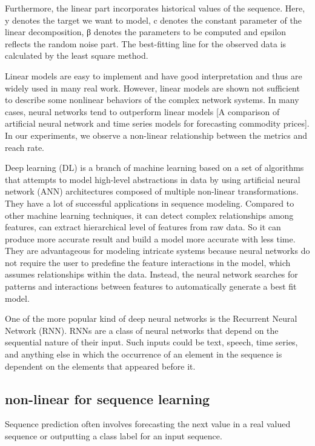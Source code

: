 \documentclass[5p]{elsarticle}
\newcommand{\dabiaolv}{reach rate}
\begin{document}
Furthermore, the linear part incorporates historical values of the sequence. Here, y denotes the target we want to model, c denotes the constant parameter of the linear decomposition, β denotes the parameters to be computed and epsilon reflects the random noise part. The best-fitting line for the observed data is calculated by the least square method.


Linear models are easy to implement and have good interpretation and thus are widely used in many real work. However, linear models are shown not sufficient to describe some nonlinear behaviors of the complex network systems. In many cases, neural networks tend to outperform linear models [A comparison of artificial neural network and time series models for forecasting commodity prices]. In our experiments, we observe a non-linear relationship between the metrics and \dabiaolv.

Deep learning (DL) is a branch of machine learning based on a set of algorithms that attempts to model high-level abstractions in data by using artificial neural network (ANN) architectures composed of multiple non-linear transformations. They have a lot of successful applications in sequence modeling. Compared to other machine learning techniques, it can detect complex relationships among features, can extract hierarchical level of features from raw data. So it can produce more accurate result and build a model more accurate with less time. They are advantageous for modeling intricate systems because neural networks do not require the user to predefine the feature interactions in the model, which assumes relationships within the data. Instead, the neural network searches for patterns and interactions between features to automatically generate a best fit model.

One of the more popular kind of deep neural networks is the Recurrent Neural Network (RNN). RNNs are a class of neural networks that depend on the sequential nature of their input. Such inputs could be text, speech, time series, and anything else in which the occurrence of an element in the sequence is dependent on the elements that appeared before it.

\subsection{non-linear for sequence learning}
Sequence prediction often involves forecasting the next value in a real valued sequence or outputting a class label for an input sequence.
\end{document}
